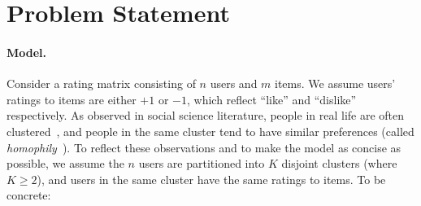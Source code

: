 \documentclass{article}
\begin{document}
\vspace{-4pt}
\section{Problem Statement}\label{sec:problem_state}
\vspace{-4pt}

\paragraph{Model.} Consider a rating matrix consisting of $n$ users and $m$ items. We assume users' ratings to items are either $+1$ or $-1$, which reflect ``like'' and ``dislike'' respectively. As observed in social science literature, people in real life are often clustered~\citep{borgatti2009network}, and people in the same cluster tend to have similar preferences (called \emph{homophily}~\citep{mcpherson2001birds}). To reflect these observations and to make the model as concise as possible, we assume the $n$ users are partitioned into $K$ disjoint clusters (where $K \ge 2$), and users in the same cluster have the same ratings to items.  To be concrete: 
\end{document}
